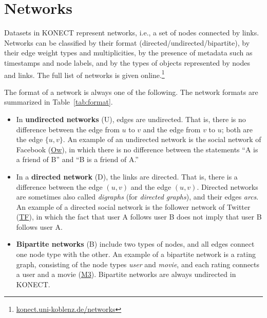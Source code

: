 \documentclass{article}
\begin{document}
\section{Networks}
\label{sec:taxonomy}
Datasets in KONECT represent networks, i.e., a set of nodes connected by
links. Networks can be classified by their format
(directed/undirected/bipartite), by their edge weight types and
multiplicities, by the 
presence of metadata such as timestamps and node labels, and by
the types of objects represented by nodes and links. 
The full list of networks is given online.\footnote{\href{http://konect.uni-koblenz.de/networks/}{konect.uni-koblenz.de/networks}}

The format of a network is always one of the following.  The network
formats are summarized in Table~\ref{tab:format}. 
\begin{itemize}
\item 
  In \textbf{undirected networks} (U), 
  edges are undirected.  That is,
  there is no difference between the edge from $u$ to $v$ and the edge
  from $v$ to $u$; both are the edge $\{u,v\}$. 
  An example of an undirected network is the social network of
  Facebook
  (\href{http://konect.uni-koblenz.de/networks/facebook-wosn-wall}{\textsf{Ow}}),
  in which there is no difference between the statements ``A 
  is a friend of B'' and ``B is a friend of A.''
\item In a \textbf{directed network} (D), 
  the links are directed. That is, there is a
  difference between the edge $(u,v)$ and the edge $(u,v)$. 
  Directed networks are sometimes also called \emph{digraphs} (for \emph{directed
    graphs}), and their edges \emph{arcs}. 
  An example of a directed social network is the follower network of
  Twitter
  (\href{http://konect.uni-koblenz.de/networks/twitter_mpi}{\textsf{TF}}),
  in which the fact that user A follows user B does not imply 
  that user B follows user A. 
\item \textbf{Bipartite networks} (B) 
  include two types of nodes, and all edges
  connect one node type with the other. An example of a bipartite
  network is a rating graph, consisting of the node types \emph{user}
  and \emph{movie}, and each rating connects a user and a movie
  (\href{http://konect.uni-koblenz.de/networks/movielens-10m_rating}{\textsf{M3}}).  
  Bipartite networks are always undirected in KONECT. 
\end{itemize}
\end{document}
